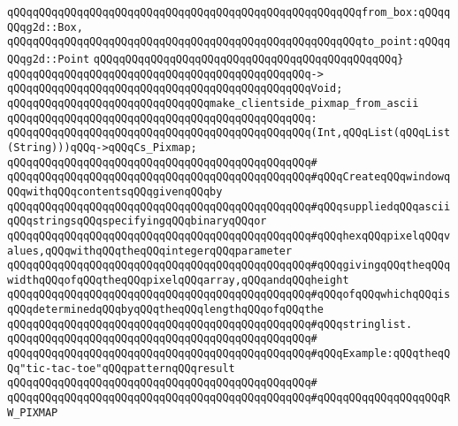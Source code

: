 \verb|qQQqqQQqqQQqqQQqqQQqqQQqqQQqqQQqqQQqqQQqqQQqqQQqqQQqqQQqfrom_box:qQQqqQQqg2d::Box,|\newline
\verb|qQQqqQQqqQQqqQQqqQQqqQQqqQQqqQQqqQQqqQQqqQQqqQQqqQQqqQQqto_point:qQQqqQQqg2d::Point|\newline
\verb|qQQqqQQqqQQqqQQqqQQqqQQqqQQqqQQqqQQqqQQqqQQqqQQq}|\newline
\verb|qQQqqQQqqQQqqQQqqQQqqQQqqQQqqQQqqQQqqQQqqQQqqQQq->|\newline
\verb|qQQqqQQqqQQqqQQqqQQqqQQqqQQqqQQqqQQqqQQqqQQqqQQqVoid;|\newline
\newline
\verb|qQQqqQQqqQQqqQQqqQQqqQQqqQQqqQQqmake_clientside_pixmap_from_ascii|\newline
\verb|qQQqqQQqqQQqqQQqqQQqqQQqqQQqqQQqqQQqqQQqqQQqqQQq:|\newline
\verb|qQQqqQQqqQQqqQQqqQQqqQQqqQQqqQQqqQQqqQQqqQQqqQQq(Int,qQQqList(qQQqList(String)))qQQq->qQQqCs_Pixmap;|\newline
\verb|qQQqqQQqqQQqqQQqqQQqqQQqqQQqqQQqqQQqqQQqqQQqqQQq#|\newline
\verb|qQQqqQQqqQQqqQQqqQQqqQQqqQQqqQQqqQQqqQQqqQQqqQQq#qQQqCreateqQQqwindowqQQqwithqQQqcontentsqQQqgivenqQQqby|\newline
\verb|qQQqqQQqqQQqqQQqqQQqqQQqqQQqqQQqqQQqqQQqqQQqqQQq#qQQqsuppliedqQQqasciiqQQqstringsqQQqspecifyingqQQqbinaryqQQqor|\newline
\verb|qQQqqQQqqQQqqQQqqQQqqQQqqQQqqQQqqQQqqQQqqQQqqQQq#qQQqhexqQQqpixelqQQqvalues,qQQqwithqQQqtheqQQqintegerqQQqparameter|\newline
\verb|qQQqqQQqqQQqqQQqqQQqqQQqqQQqqQQqqQQqqQQqqQQqqQQq#qQQqgivingqQQqtheqQQqwidthqQQqofqQQqtheqQQqpixelqQQqarray,qQQqandqQQqheight|\newline
\verb|qQQqqQQqqQQqqQQqqQQqqQQqqQQqqQQqqQQqqQQqqQQqqQQq#qQQqofqQQqwhichqQQqisqQQqdeterminedqQQqbyqQQqtheqQQqlengthqQQqofqQQqthe|\newline
\verb|qQQqqQQqqQQqqQQqqQQqqQQqqQQqqQQqqQQqqQQqqQQqqQQq#qQQqstringlist.|\newline
\verb|qQQqqQQqqQQqqQQqqQQqqQQqqQQqqQQqqQQqqQQqqQQqqQQq#|\newline
\verb|qQQqqQQqqQQqqQQqqQQqqQQqqQQqqQQqqQQqqQQqqQQqqQQq#qQQqExample:qQQqtheqQQq"tic-tac-toe"qQQqpatternqQQqresult|\newline
\verb|qQQqqQQqqQQqqQQqqQQqqQQqqQQqqQQqqQQqqQQqqQQqqQQq#|\newline
\verb|qQQqqQQqqQQqqQQqqQQqqQQqqQQqqQQqqQQqqQQqqQQqqQQq#qQQqqQQqqQQqqQQqqQQqRW_PIXMAP|\newline
